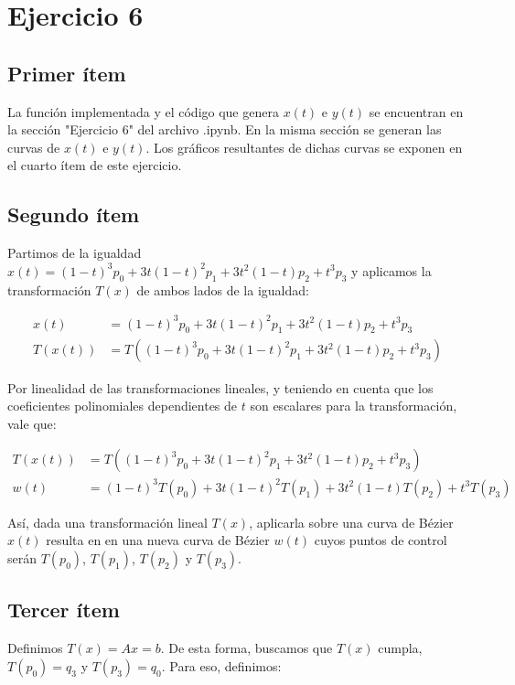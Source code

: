 \documentclass{article}
\begin{document}
\section*{Ejercicio 6}
\subsection*{Primer ítem}
La función implementada y el código que genera $x(t)$ e $y(t)$ se encuentran en la sección "Ejercicio 6" del archivo .ipynb. En la misma sección se generan las curvas de $x(t)$ e $y(t)$. Los gráficos resultantes de dichas curvas se exponen en el cuarto ítem de este ejercicio.

\subsection*{Segundo ítem}
Partimos de la igualdad $x(t) = (1 - t)^3 p_0 + 3t(1 - t)^2 p_1 + 3t^2(1 - t) p_2 + t^3 p_3$ y aplicamos la transformación $T(x)$ de ambos lados de la igualdad:

$$
\begin{aligned}
x(t) &= (1 - t)^3 p_0 + 3t(1 - t)^2 p_1 + 3t^2(1 - t) p_2 + t^3 p_3 \\
T(x(t)) &= T((1 - t)^3 p_0 + 3t(1 - t)^2 p_1 + 3t^2(1 - t) p_2 + t^3 p_3)
\end{aligned}
$$

Por linealidad de las transformaciones lineales, y teniendo en cuenta que los coeficientes polinomiales dependientes de $t$ son escalares para la transformación, vale que:

$$
\begin{aligned}
T(x(t)) &= T((1 - t)^3 p_0 + 3t(1 - t)^2 p_1 + 3t^2(1 - t) p_2 + t^3 p_3) \\
w(t) &= (1 - t)^3 T(p_0) + 3t(1 - t)^2 T(p_1) + 3t^2(1 - t) T(p_2) + t^3 T(p_3)
\end{aligned}
$$

Así, dada una transformación lineal $T(x)$, aplicarla sobre una curva de Bézier $x(t)$ resulta en en una nueva curva de Bézier $w(t)$ cuyos puntos de control serán  $T(p_0)$,  $T(p_1)$,  $T(p_2)$ y  $T(p_3)$.

\subsection*{Tercer ítem}
Definimos $T(x) = Ax = b$. De esta forma, buscamos que $T(x)$ cumpla, $T(p_0) = q_3$ y $T(p_3) = q_0$. 
Para eso, definimos: 
\end{document}
